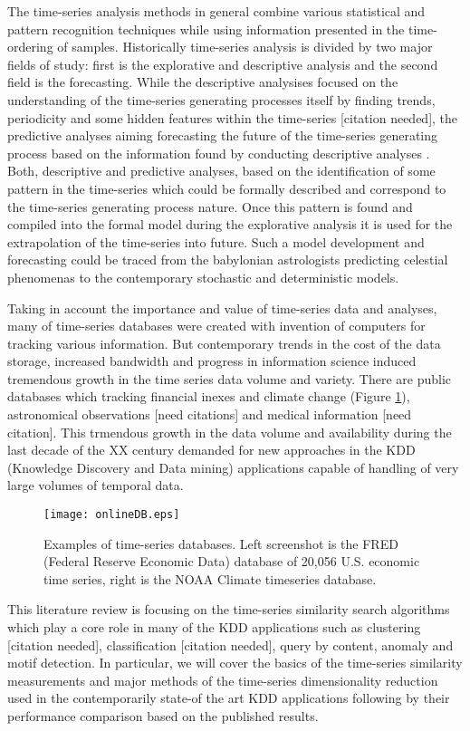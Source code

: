 The time-series analysis methods in general combine various statistical and pattern recognition techniques while using information presented in the time-ordering of samples. Historically time-series analysis is divided by two major fields of study: first is the explorative and descriptive analysis and the second field is the forecasting. 
While the descriptive analysises focused on the understanding of the time-series generating processes itself by finding trends, periodicity and some hidden features within the time-series [citation needed], the predictive analyses aiming forecasting the future of the time-series generating process based on the information found by conducting descriptive analyses \cite{citeulike:3449765}. 
Both, descriptive and predictive analyses, based on the identification of some pattern in the time-series which could be formally described and correspond to the time-series generating process nature. Once this pattern is found and compiled into the formal model during the explorative analysis it is used for the extrapolation of the time-series into future. Such a model development and forecasting could be traced from the babylonian astrologists predicting celestial phenomenas to the contemporary stochastic and deterministic models.

Taking in account the importance and value of time-series data and analyses, many of time-series databases were created with invention of computers for tracking various information. But contemporary trends in the cost of the data storage, increased bandwidth and progress in information science induced tremendous growth in the time series data volume and variety. There are public databases which tracking financial inexes and climate change (Figure \ref{fig:onlineDB}), astronomical observations [need citations] and medical information [need citation]. This trmendous growth in the data volume and availability during the last decade of the XX century demanded for new approaches in the KDD (Knowledge Discovery and Data mining) applications capable of handling of very large volumes of temporal data.

\begin{figure}[tbp]
   \centering
   \texttt{[image: onlineDB.eps]}
   \caption{Examples of time-series databases. Left screenshot is the FRED (Federal Reserve Economic Data) database of 20,056 U.S. economic time series, right is the NOAA Climate timeseries database.}
   \label{fig:onlineDB}
\end{figure} 

This literature review is focusing on the time-series similarity search algorithms which play a core role in many of the KDD applications such as clustering [citation needed], classification [citation needed], query by content, anomaly and motif detection. In particular, we will cover the basics of the time-series similarity measurements and major methods of the time-series dimensionality reduction used in the contemporarily state-of the art KDD applications following by their performance comparison based on the published results.